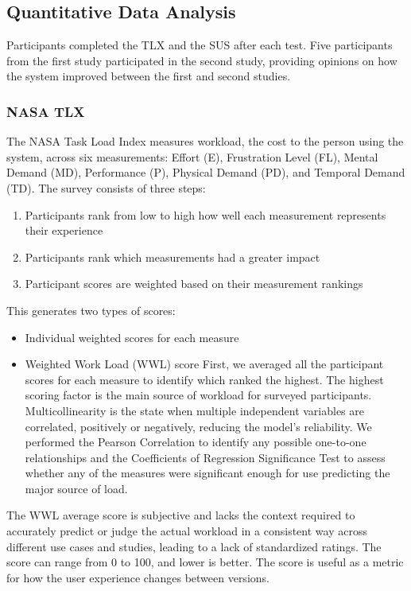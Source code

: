 \documentclass[thesis]{fputhesis}
\begin{document}
\begin{body}
\subsection{Quantitative Data Analysis}
Participants completed the TLX and the SUS after each test. Five participants from the first study participated in the second study, providing opinions on how the system improved between the first and second studies. 
\subsubsection{NASA TLX}
The NASA Task Load Index measures workload, the cost to the person using the system, across six measurements: Effort (E), Frustration Level (FL), Mental Demand (MD), Performance (P), Physical Demand (PD), and Temporal Demand (TD). The survey consists of three steps: 
\begin{enumerate}
    \item Participants rank from low to high how well each measurement represents their experience
    \item Participants rank which measurements had a greater impact
    \item Participant scores are weighted based on their measurement rankings
\end{enumerate}
\filbreak
This generates two types of scores: 
\begin{itemize}
    \item Individual weighted scores for each measure
    \item Weighted Work Load (WWL) score
First, we averaged all the participant scores for each measure to identify which ranked the highest. The highest scoring factor is the main source of workload for surveyed participants. Multicollinearity is the state when multiple independent variables are correlated, positively or negatively, reducing the model's reliability. We performed the Pearson Correlation to identify any possible one-to-one relationships and the Coefficients of Regression Significance Test to assess whether any of the measures were significant enough for use predicting the major source of load.
\end{itemize}

The WWL average score is subjective and lacks the context required to accurately predict or judge the actual workload in a consistent way across different use cases and studies, leading to a lack of standardized ratings. The score can range from 0 to 100, and lower is better. The score is useful as a metric for how the user experience changes between versions.

\end{body}
\end{document}
